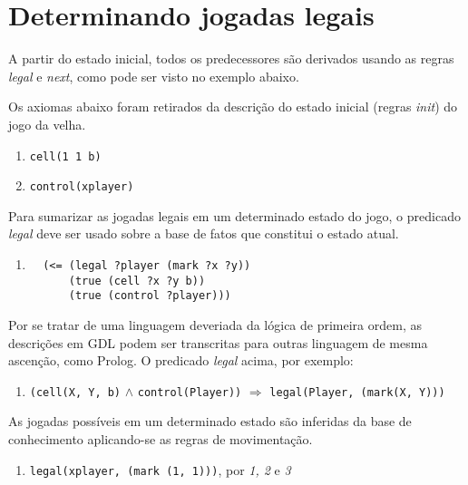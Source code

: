 \section{Determinando jogadas legais}
A partir do estado inicial, todos os predecessores são derivados usando as regras \textit{legal} e \textit{next}, como pode ser visto no exemplo abaixo.

Os axiomas abaixo foram retirados da descrição do estado inicial (regras \textit{init}) do jogo da velha.
\begin{enumerate}
  \singlespacing
  \item \verb|cell(1 1 b)|
  \item \verb|control(xplayer)|
\end{enumerate}
 \doublespacing

Para sumarizar as jogadas legais em um determinado estado do jogo, o predicado \textit{legal} deve ser usado sobre a base de fatos que constitui o estado atual.

\begin{enumerate}
	\singlespacing
  	\setcounter{enumi}{2}
  	\item 
  		\begin{verbatim}
  (<= (legal ?player (mark ?x ?y))                                                                       
      (true (cell ?x ?y b))                                                                              
      (true (control ?player)))               
 		\end{verbatim}
\end{enumerate}
 \doublespacing

Por se tratar de uma linguagem deveriada da lógica de primeira ordem, as descrições em GDL podem ser transcritas para outras linguagem de mesma ascenção, como Prolog. O predicado \textit{legal} acima, por exemplo:

\begin{enumerate}
 	\singlespacing
  	\setcounter{enumi}{2}
  	\item 
  		\verb|(cell(X, Y, b)| $\land$ \verb|control(Player))| $\Rightarrow$ \verb|legal(Player, (mark(X, Y)))|
\end{enumerate}
 \doublespacing

As jogadas possíveis em um determinado estado são inferidas da base de conhecimento aplicando-se as regras de movimentação.
\begin{enumerate}
  	\singlespacing
  	\setcounter{enumi}{3}
  	\item 
  		\verb|legal(xplayer, (mark (1, 1)))|, por {\it 1, 2} e {\it 3}
\end{enumerate}
\doublespacing

